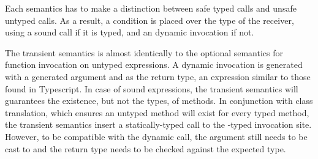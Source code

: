 \documentclass[runnningheads]{tex/llncs}
\begin{document}
Each semantics has to make a distinction between safe typed calls and
unsafe untyped calls. As a result, a condition is placed over the type of the receiver, 
using a sound call if it is typed, and an dynamic invocation if not.

The transient semantics is almost identically to the optional semantics 
for function invocation on untyped expressions. 
A dynamic invocation is generated with a generated argument 
and \any as the return type, an expression similar to those found in Typescript.
In case of sound expressions, the transient semantics will guarantees the existence,
but not the types, of methods. In conjunction with class translation, which
ensures an untyped method will exist for every typed method, the
transient semantics insert a statically-typed call to the \any-typed
invocation site. However, to be compatible with the dynamic call,
the argument still needs to be cast to \any and the return type
needs to be checked against the expected type.
\end{document}
